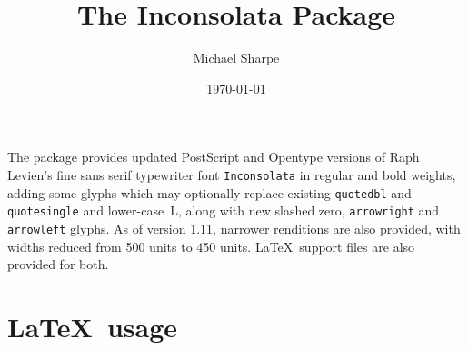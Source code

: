 \documentclass[11pt]{article}
\title{The Inconsolata  Package}
\author{Michael Sharpe}
\date{\today}  %
\begin{document}
\maketitle
The package provides updated PostScript and Opentype versions of Raph Levien's fine sans serif typewriter font
\texttt{Inconsolata} in regular and bold weights, adding some glyphs which may optionally replace existing \texttt{quotedbl} and \texttt{quotesingle} and lower-case~L, along with new slashed zero, \texttt{arrowright} and \texttt{arrowleft} glyphs. As of version 1.11,  narrower renditions are also provided, with widths reduced from 500 units to 450 units. \LaTeX\ support files are also provided for both. 

\section*{\LaTeX\ usage}
\end{document}
